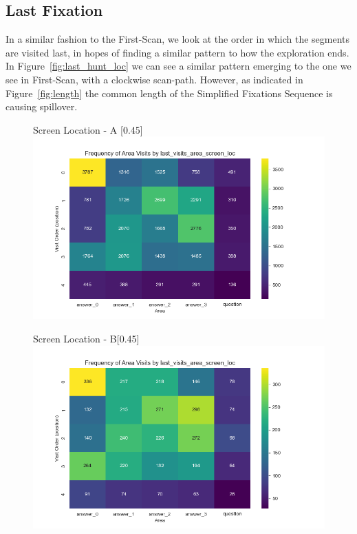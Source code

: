 \documentclass{article}
\begin{document}
    
    \subsection{Last Fixation}

    In a similar fashion to the First-Scan, we look at the order in which the segments are visited last, in hopes of finding a similar pattern to how the exploration ends. In Figure~\ref{fig:last_hunt_loc} we can see a similar pattern emerging to the one we see in First-Scan, with a clockwise scan-path. However, as indicated in Figure~\ref{fig:length} the common length of the Simplified Fixations Sequence is causing spillover. 

    \begin{figure}[H]
      \centering
      \begin{subcaptionbox}{Screen Location - A \label{fig:aaa}}[0.45\textwidth]
        {\centering\includegraphics[width=\linewidth]{plots/visits/matrix__last_visits_area_screen_loc_hunters_A.png}}
      \end{subcaptionbox}
      \hfill
      \begin{subcaptionbox}{Screen Location - B\label{fig:bbb}}[0.45\textwidth]
        {\centering\includegraphics[width=\linewidth]{plots/visits/matrix__last_visits_area_screen_loc_hunters_B.png}}
      \end{subcaptionbox}
      

\end{figure}
\end{document}
